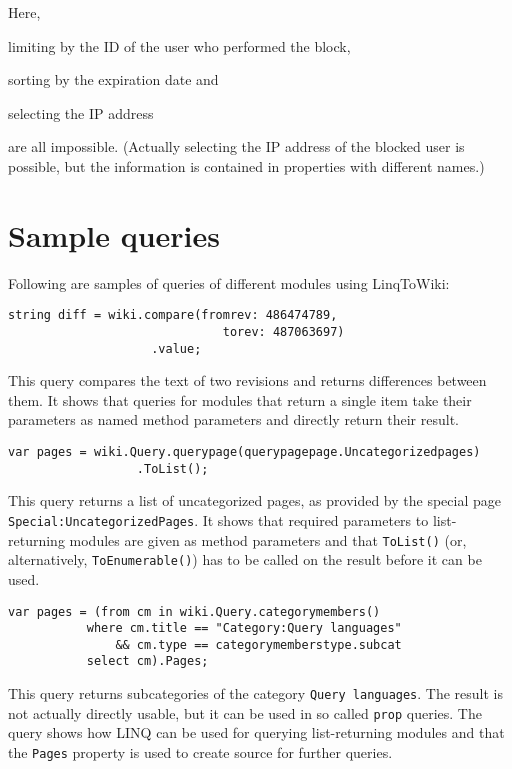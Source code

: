 Here,
\begin{compactitem}
\item limiting by the ID of the user who performed the block,
\item sorting by the expiration date and
\item selecting the \ac{IP} address
\end{compactitem}
are all impossible.
(Actually selecting the \ac{IP} address of the blocked user is possible,
but the information is contained in properties with different names.)

\section{Sample queries}

Following are samples of queries of different modules using LinqToWiki:

\begin{lstlisting}
string diff = wiki.compare(fromrev: 486474789,
                              torev: 487063697)
                    .value;
\end{lstlisting}

This query compares the text of two revisions and returns differences between them.
It shows that queries for modules that return a single item take their parameters as named method parameters
and directly return their result.

\begin{lstlisting}
var pages = wiki.Query.querypage(querypagepage.Uncategorizedpages)
                  .ToList();
\end{lstlisting}

This query returns a list of uncategorized pages,
as provided by the special page \texttt{Special:UncategorizedPages}.
It shows that required parameters to list-returning modules are given as method parameters
and that \lstinline{ToList()} (or, alternatively, \lstinline{ToEnumerable()})
has to be called on the result before it can be used.

\begin{lstlisting}
var pages = (from cm in wiki.Query.categorymembers()
	       where cm.title == "Category:Query languages"
	           && cm.type == categorymemberstype.subcat
	       select cm).Pages;
\end{lstlisting}

This query returns subcategories of the category \texttt{Query languages}.
The result is not actually directly usable, but it can be used in so called \texttt{prop} queries.
The query shows how LINQ can be used for querying list-returning modules
and that the \lstinline{Pages} property is used to create source for further queries.

